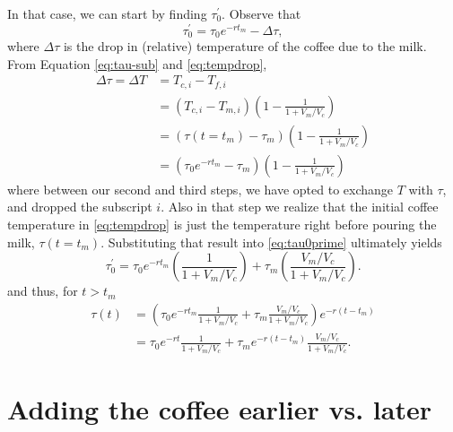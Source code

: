 \documentclass[11pt]{article}
\begin{document}
In that case, we can start by finding $\tau_{0}^{'}$. Observe that
\begin{equation}
\tau_{0}^{'} = \tau_{0} e^{-rt_{m}} - \Delta \tau, \label{eq:tau0prime}
\end{equation}
where $\Delta \tau$ is the drop in (relative) temperature of the coffee due to the milk. From Equation \eqref{eq:tau-sub} and \eqref{eq:tempdrop}, 
\begin{align*}
\Delta \tau = \Delta T &= T_{c,i} - T_{f,i}  \\
&= (T_{c,i} - T_{m,i})\left(1-\frac{1}{1+V_{m}/V_{c}}\right) \\
&= (\tau(t=t_{m})- \tau_{m})\left(1-\frac{1}{1+V_{m}/V_{c}}\right) \\
&= (\tau_{0}e^{-rt_{m}}  - \tau_{m})\left(1-\frac{1}{1+V_{m}/V_{c}}\right) 
\end{align*}
where between our second and third steps, we have opted to exchange $T$ with $\tau$, and dropped the subscript $i$. Also in that step we realize that the initial coffee temperature in \eqref{eq:tempdrop} is just the temperature right before pouring the milk, $\tau(t=t_{m})$. Substituting that result into \eqref{eq:tau0prime} ultimately yields
\[
\tau_{0}^{'} = \tau_{0}e^{-rt_{m}}\left(\frac{1}{1+V_{m}/V_{c}}\right)  + \tau_{m}\left(\frac{V_{m}/V_{c}}{1+V_{m}/V_{c}}\right). \label{eq:tau0primefin}
\]
and thus, for $t > t_{m}$
\begin{align}
\tau(t) &= \left(\tau_{0}e^{-rt_{m}}\frac{1}{1+V_{m}/V_{c}} + \tau_{m}\frac{V_{m}/V_{c}}{1+V_{m}/V_{c}}\right)e^{-r(t - t_{m})} \nonumber \\[0.4em]
&= \tau_{0}e^{-rt}\frac{1}{1+V_{m}/V_{c}} + \tau_{m}e^{-r(t - t_{m})}\frac{V_{m}/V_{c}}{1+V_{m}/V_{c}}. \label{eq:tau_t_final}
\end{align}

\section{Adding the coffee earlier vs. later}
\end{document}
